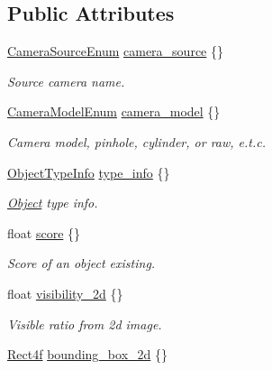 \subsection*{Public Attributes}
\begin{DoxyCompactItemize}
\item 
\hyperlink{structmaf__perception__interface_1_1CameraSourceEnum}{Camera\+Source\+Enum} \hyperlink{structmaf__perception__interface_1_1Object_a3c364be7536d73c6323d3f317c4ebc4b}{camera\+\_\+source} \{\}
\begin{DoxyCompactList}\small\item\em Source camera name. \end{DoxyCompactList}\item 
\hyperlink{structmaf__perception__interface_1_1CameraModelEnum}{Camera\+Model\+Enum} \hyperlink{structmaf__perception__interface_1_1Object_a469d36c62b09056c0246aeaacf31cd23}{camera\+\_\+model} \{\}
\begin{DoxyCompactList}\small\item\em Camera model, pinhole, cylinder, or raw, e.\+t.\+c. \end{DoxyCompactList}\item 
\hyperlink{structmaf__perception__interface_1_1ObjectTypeInfo}{Object\+Type\+Info} \hyperlink{structmaf__perception__interface_1_1Object_a34c3c4467c522ad910b4e3e671dda51d}{type\+\_\+info} \{\}
\begin{DoxyCompactList}\small\item\em \hyperlink{structmaf__perception__interface_1_1Object}{Object} type info. \end{DoxyCompactList}\item 
float \hyperlink{structmaf__perception__interface_1_1Object_aa84395f058f2aaf3862b8a351952941e}{score} \{\}
\begin{DoxyCompactList}\small\item\em Score of an object existing. \end{DoxyCompactList}\item 
float \hyperlink{structmaf__perception__interface_1_1Object_a18a3205b770225fdd5d7ec3660176397}{visibility\+\_\+2d} \{\}
\begin{DoxyCompactList}\small\item\em Visible ratio from 2d image. \end{DoxyCompactList}\item 
\hyperlink{structmaf__perception__interface_1_1Rect4f}{Rect4f} \hyperlink{structmaf__perception__interface_1_1Object_ab802b7a36f646b3e65d108b91ec0324b}{bounding\+\_\+box\+\_\+2d} \{\}

\end{DoxyCompactItemize}
